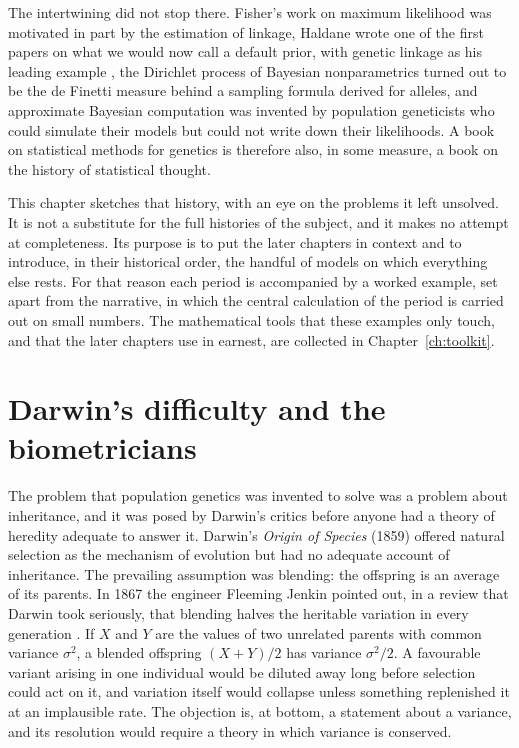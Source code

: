 The intertwining did not stop there. Fisher's work on maximum likelihood was motivated in part by
the estimation of linkage, Haldane wrote one of the first papers on what we would now call a
default prior, with genetic linkage as his leading example \citep{intro:haldane1932prior}, the Dirichlet process
of Bayesian nonparametrics turned out to be the de Finetti measure behind a sampling formula
derived for alleles, and approximate Bayesian computation was invented by population geneticists
who could simulate their models but could not write down their likelihoods. A book on statistical
methods for genetics is therefore also, in some measure, a book on the history of statistical
thought.

This chapter sketches that history, with an eye on the problems it left unsolved. It is not a
substitute for the full histories of the subject, and it makes no attempt at completeness. Its
purpose is to put the later chapters in context and to introduce, in their historical order, the
handful of models on which everything else rests. For that reason each period is accompanied by a
worked example, set apart from the narrative, in which the central calculation of the period is
carried out on small numbers. The mathematical tools that these examples only touch, and that
the later chapters use in earnest, are collected in Chapter~\ref{ch:toolkit}.

\section{Darwin's difficulty and the biometricians}

The problem that population genetics was invented to solve was a problem about inheritance, and it
was posed by Darwin's critics before anyone had a theory of heredity adequate to answer it.
Darwin's \emph{Origin of Species} (1859) offered natural selection as the mechanism of evolution
but had no adequate account of inheritance. The prevailing assumption was blending: the offspring
is an average of its parents. In 1867 the engineer Fleeming Jenkin pointed out, in a review that
Darwin took seriously, that blending halves the heritable variation in every generation
\citep{intro:jenkin1867}. If $X$ and $Y$ are the values of two unrelated parents with common
variance $\sigma^2$, a blended offspring $(X+Y)/2$ has variance $\sigma^2/2$. A favourable variant
arising in one individual would be diluted away long before selection could act on it, and
variation itself would collapse unless something replenished it at an implausible rate. The
objection is, at bottom, a statement about a variance, and its resolution would require a theory
in which variance is conserved.

